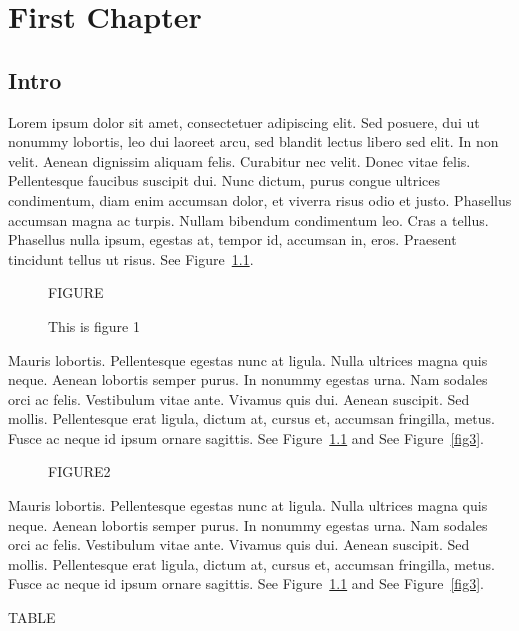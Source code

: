 \documentclass{report}
\begin{document}
\tableofcontents
\listoffigures
\chapter{First Chapter}

\section{Intro}

Lorem ipsum dolor sit amet, consectetuer adipiscing elit. Sed posuere, dui ut
nonummy lobortis, leo dui laoreet arcu, sed blandit lectus libero sed elit. In
non velit. Aenean dignissim aliquam felis. Curabitur nec velit. Donec vitae
felis. Pellentesque faucibus suscipit dui. Nunc dictum, purus congue ultrices
condimentum, diam enim accumsan dolor, et viverra risus odio et justo. Phasellus
accumsan magna ac turpis. Nullam bibendum condimentum leo. Cras a tellus.
Phasellus nulla ipsum, egestas at, tempor id, accumsan in, eros. Praesent
tincidunt tellus ut risus.  See Figure~\ref{fig1}.

\begin{figure}[h]
\begin{center}
{\Large FIGURE}
\label{fig1}
\caption{This is figure 1}
\end{center}
\end{figure}

Mauris lobortis. Pellentesque egestas nunc at ligula. Nulla ultrices magna quis
neque. Aenean lobortis semper purus. In nonummy egestas urna. Nam sodales orci
ac felis. Vestibulum vitae ante. Vivamus quis dui. Aenean suscipit. Sed mollis.
Pellentesque erat ligula, dictum at, cursus et, accumsan fringilla, metus. Fusce
ac neque id ipsum ornare sagittis.  See Figure~\ref{fig1} and See Figure~\ref{fig3}.

\begin{figure}[ht]
\centering
{\Large FIGURE2}
\end{figure}

Mauris lobortis. Pellentesque egestas nunc at ligula. Nulla ultrices magna quis
neque. Aenean lobortis semper purus. In nonummy egestas urna. Nam sodales orci
ac felis. Vestibulum vitae ante. Vivamus quis dui. Aenean suscipit. Sed mollis.
Pellentesque erat ligula, dictum at, cursus et, accumsan fringilla, metus. Fusce
ac neque id ipsum ornare sagittis.  See Figure~\ref{fig1} and See Figure~\ref{fig3}.

\begin{table}[ht]
\centering
{\Large TABLE}
\end{table}
\end{document}
